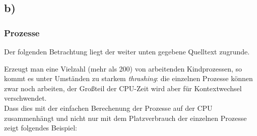 \documentclass[a4paper,
12pt,
BCOR12mm,
]{scrartcl}
\begin{document}
\subsection*{b)}
\subsubsection*{Prozesse}
Der folgenden Betrachtung liegt der weiter unten gegebene Quelltext zugrunde.

\begin{figure}[h!]
	\begin{center}
	\end{center}
\end{figure}

Erzeugt man eine Vielzahl (mehr als 200) von arbeitenden Kindprozessen, so kommt es unter Umständen zu
starkem \emph{thrashing}: die einzelnen Prozesse können zwar noch arbeiten, der Großteil
der CPU-Zeit wird aber für Kontextwechsel verschwendet.\\
Dass dies mit der einfachen Berechenung der Prozesse auf der CPU zusammenhängt und nicht
nur mit dem Platzverbrauch der einzelnen Prozesse zeigt folgendes Beispiel:
\end{document}
